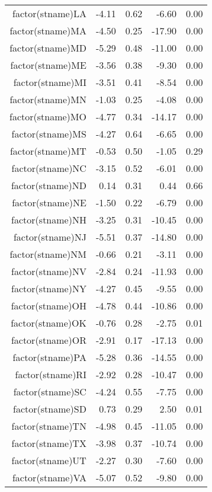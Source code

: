 \begin{table}[ht]
\begin{tabular}{rrrrr}
  factor(stname)LA & -4.11 & 0.62 & -6.60 & 0.00 \\ 
  factor(stname)MA & -4.50 & 0.25 & -17.90 & 0.00 \\ 
  factor(stname)MD & -5.29 & 0.48 & -11.00 & 0.00 \\ 
  factor(stname)ME & -3.56 & 0.38 & -9.30 & 0.00 \\ 
  factor(stname)MI & -3.51 & 0.41 & -8.54 & 0.00 \\ 
  factor(stname)MN & -1.03 & 0.25 & -4.08 & 0.00 \\ 
  factor(stname)MO & -4.77 & 0.34 & -14.17 & 0.00 \\ 
  factor(stname)MS & -4.27 & 0.64 & -6.65 & 0.00 \\ 
  factor(stname)MT & -0.53 & 0.50 & -1.05 & 0.29 \\ 
  factor(stname)NC & -3.15 & 0.52 & -6.01 & 0.00 \\ 
  factor(stname)ND & 0.14 & 0.31 & 0.44 & 0.66 \\ 
  factor(stname)NE & -1.50 & 0.22 & -6.79 & 0.00 \\ 
  factor(stname)NH & -3.25 & 0.31 & -10.45 & 0.00 \\ 
  factor(stname)NJ & -5.51 & 0.37 & -14.80 & 0.00 \\ 
  factor(stname)NM & -0.66 & 0.21 & -3.11 & 0.00 \\ 
  factor(stname)NV & -2.84 & 0.24 & -11.93 & 0.00 \\ 
  factor(stname)NY & -4.27 & 0.45 & -9.55 & 0.00 \\ 
  factor(stname)OH & -4.78 & 0.44 & -10.86 & 0.00 \\ 
  factor(stname)OK & -0.76 & 0.28 & -2.75 & 0.01 \\ 
  factor(stname)OR & -2.91 & 0.17 & -17.13 & 0.00 \\ 
  factor(stname)PA & -5.28 & 0.36 & -14.55 & 0.00 \\ 
  factor(stname)RI & -2.92 & 0.28 & -10.47 & 0.00 \\ 
  factor(stname)SC & -4.24 & 0.55 & -7.75 & 0.00 \\ 
  factor(stname)SD & 0.73 & 0.29 & 2.50 & 0.01 \\ 
  factor(stname)TN & -4.98 & 0.45 & -11.05 & 0.00 \\ 
  factor(stname)TX & -3.98 & 0.37 & -10.74 & 0.00 \\ 
  factor(stname)UT & -2.27 & 0.30 & -7.60 & 0.00 \\ 
  factor(stname)VA & -5.07 & 0.52 & -9.80 & 0.00 \\ 

\end{tabular}
\end{table}

